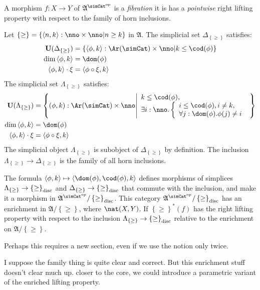 \documentclass{tac}
\newcommand\set[1]{\left\{#1\right\}}
\newcommand\ri{^*}
\newcommand\dual{^{\mathrm{op}}}
\newcommand\s{^{\simCat\dual}}
\newcommand\of{:}
\newcommand\simplex\Delta
\newcommand\horn\Lambda
\newcommand\tuplet[1]{\left\langle #1 \right\rangle}
\newcommand\base{\mathbf{U}}
\newcommand\ambient{\mathfrak A}
\newcommand\disc{_{\rm disc}}
\newcommand\keyword[1]{\emph{#1}\label{#1}}
\begin{document}
\begin{definition} A morphism $f\of X\to Y$ of $\ambient\s$ is a \keyword{fibration} it is has a \emph{pointwise} right lifting property with respect to the family of horn inclusions.

Let $\set\geq = \set{\tuplet{n,k}\of \nno\times\nno |n\geq k}$ in $\ambient$.
The simplicial set $\simplex_{\set\geq}$ satisfies:
\begin{align*}
\base(\simplex_{\set\geq}) &= \set{\tuplet{\phi,k}\of\Ar(\simCat)\times\nno| k\leq \cod(\phi) } \\
\dim\tuplet{\phi,k} &= \dom(\phi) \\
\tuplet{\phi,k}\cdot \xi &= \tuplet{\phi\circ\xi,k}
\end{align*}
The simplicial set $\horn_{\set\geq}$ satisfies:
\begin{align*}
\base(\horn_{\set\geq}) &= \set{(\phi,k)\of\Ar(\simCat)\times\nno\middle| 
\begin{array}{l}
k\leq \cod(\phi),\\
\exists i\of\nno.\left\{\begin{array}{l}i\leq \cod(\phi), i\neq k,\\ \forall j\of \dom(\phi).\phi(j)\neq i \end{array}\right. 
\end{array}
} \\
\dim\tuplet{\phi,k} &= \dom(\phi) \\
\tuplet{\phi,k}\cdot \xi &= \tuplet{\phi\circ\xi,k}
\end{align*}
The simplicial object $\horn_{\set\geq}$ is subobject of $\simplex_{\set\geq}$ by definition. 
The inclusion $\horn_{\set\geq}\to\simplex_{\set\geq}$ is the family of all horn inclusions.

The formula $\tuplet{\phi,k}\mapsto \tuplet{\dom(\phi),\cod(\phi),k}$ defines morphisms of simplices $\horn_{\set\geq}\to\set\geq\disc$ and $\simplex_{\set\geq}\to\set\geq\disc$ that commute with the inclusion, and make it a morphism in $\ambient\s/\set\geq\disc$. This category $\ambient\s/\set\geq\disc$ has an enrichment in $\ambient/\set\geq$, where $\nat(X,Y)$. If $\set\geq\ri(f)$ has the right lifting property with respect to the inclusion $\horn_{\set\geq}\to\set\geq\disc$ relative to the enrichment on $\ambient/\set\geq$.
\end{definition}

Perhaps this requires a new section, even if we use the notion only twice.

I suppose the family thing is quite clear and correct. But this enrichment stuff doesn't clear much up.
closer to the core, we could introduce a parametric variant of the enriched lifting property.
\end{document}
